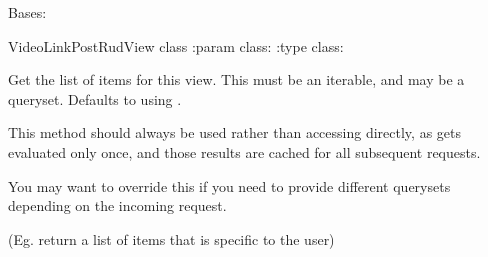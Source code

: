 \documentclass[letterpaper,10pt,english]{sphinxmanual}
\begin{document}

\begin{fulllineitems}
\label{\detokenize{vtcvlp:vtcuser.views.VideoLinkPostRudView}}
Bases: 

VideoLinkPostRudView class
:param class: 
:type class: 

\begin{fulllineitems}
\label{\detokenize{vtcvlp:vtcuser.views.VideoLinkPostRudView.authentication_classes}}
\end{fulllineitems}


\begin{fulllineitems}
\label{\detokenize{vtcvlp:vtcuser.views.VideoLinkPostRudView.get_queryset}}
Get the list of items for this view.
This must be an iterable, and may be a queryset.
Defaults to using .

This method should always be used rather than accessing 
directly, as  gets evaluated only once, and those results
are cached for all subsequent requests.

You may want to override this if you need to provide different
querysets depending on the incoming request.

(Eg. return a list of items that is specific to the user)

\end{fulllineitems}


\end{fulllineitems}
\end{document}
